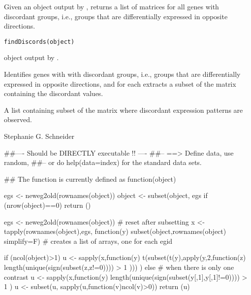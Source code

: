 \documentclass[a4paper]{book}
\begin{document}
%
\begin{Description}\relax
Given an  object output by , returns a list of matrices for all genes with discordant groups, i.e., groups that are differentially expressed in opposite directions.  
\end{Description}
%
\begin{Usage}
\begin{verbatim}
findDiscords(object)
\end{verbatim}
\end{Usage}
%
\begin{Arguments}
\begin{ldescription}
\item[\code{object}] 
 object output by .

\end{ldescription}
\end{Arguments}
%
\begin{Details}\relax
Identifies genes with with discordant groups, i.e., groups that are differentially expressed in opposite directions, and for each extracts a subset of the  matrix containing the discordant values.
\end{Details}
%
\begin{Value}
A list containing subset of the  matrix where discordant expression patterns are observed.
\end{Value}
%
\begin{Author}\relax
Stephanie G. Schneider
\end{Author}
%
\begin{SeeAlso}\relax
{}
\end{SeeAlso}
%
\begin{Examples}
\begin{ExampleCode}
##---- Should be DIRECTLY executable !! ----
##-- ==>  Define data, use random,
##--	or do  help(data=index)  for the standard data sets.

## The function is currently defined as
function(object) { 
  egs <- neweg2old(rownames(object))
  object <- subset(object, egs %
  if (nrow(object)==0) return ()

  egs <- neweg2old(rownames(object))  # reset after subsetting
  x <- tapply(rownames(object),egs,
              function(y) subset(object,rownames(object) %
              simplify=F)
  # creates a list of arrays, one for each egid

  if (ncol(object)>1) { 
    u <- sapply(x,function(y) {
      t(subset(t(y),apply(y,2,function(z) {
         length(unique(sign(subset(z,z!=0)))) > 1
      })))
    })
  } else {
     # when there is only one contrast
     u <- sapply(x,function(y) {
        length(unique(sign(subset(y[,1],y[,1]!=0)))) > 1
     })
  }
  u <- subset(u, sapply(u,function(v)ncol(v)>0))
  return (u)
  }
\end{ExampleCode}
\end{Examples}
\end{document}
